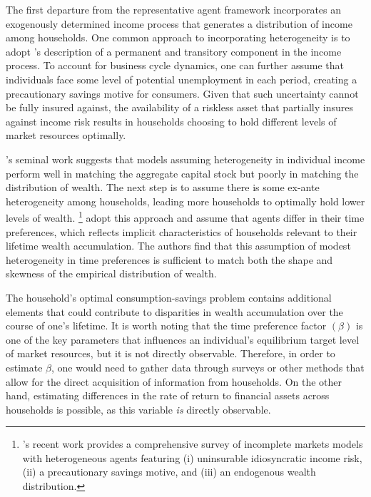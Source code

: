 \par The first departure from the representative agent framework incorporates an exogenously determined income process that generates a distribution of income among households. One common approach to incorporating heterogeneity is to adopt \cite{mf1957}'s description of a permanent and transitory component in the income process. To account for business cycle dynamics, one can further assume that individuals face some level of potential unemployment in each period, creating a precautionary savings motive for consumers. Given that such uncertainty cannot be fully insured against, the availability of a riskless asset that partially insures against income risk results in households choosing to hold different levels of market resources optimally.

\par  \cite{ks1998}'s seminal work suggests that models assuming heterogeneity in individual income perform well in matching the aggregate capital stock but poorly in matching the distribution of wealth. The next step is to assume there is some ex-ante heterogeneity among households, leading more households to optimally hold lower levels of wealth. \footnote{ \cite{gkgv22}'s  recent work provides a comprehensive survey of incomplete markets models with heterogeneous agents featuring (i) uninsurable idiosyncratic income risk, (ii) a precautionary savings motive, and (iii) an endogenous wealth distribution.}  \cite{cstw2017} adopt this approach and assume that agents differ in their time preferences, which reflects implicit characteristics of households relevant to their lifetime wealth accumulation. The authors find that this assumption of modest heterogeneity in time preferences is sufficient to match both the shape and skewness of the empirical distribution of wealth.

\par The household's optimal consumption-savings problem contains additional elements that could contribute to disparities in wealth accumulation over the course of one's lifetime. It is worth noting that the time preference factor $(\beta)$ is one of the key parameters that influences an individual's equilibrium target level of market resources, but it is not directly observable. Therefore, in order to estimate $\beta$, one would need to gather data through surveys or other methods that allow for the direct acquisition of information from households. On the other hand, estimating differences in the rate of return to financial assets across households is possible, as this variable \textit{is} directly observable. 

